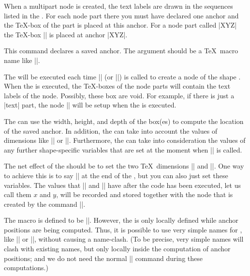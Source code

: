 \begin{command}{\pgfdeclareshape{}}
\begin{command}{\nodeparts{}}
    When a multipart node is created, the text labels are drawn in the
    sequences listed in the . For each node
    part there you must have declared one anchor and the \TeX-box of
    the part is placed at this anchor. For a node part called |XYZ|
    the \TeX-box |\pgfnodepartXYZbox| is placed at anchor |XYZ|.
  \end{command}

  \begin{command}{\savedanchor{}}
    This command declares a saved anchor. The argument 
    should be a \TeX\ macro name like |\centerpoint|.

    The  will be executed each time |\pgfnode| (or
    |\pgfmultipartnode|) is called to  create a node of the shape
    . When the 
    is executed, the \TeX-boxes of the node parts will contain the
    text labels of the node. Possibly, these box are void. For
    example, if there is just a |text| part, the node
    |\pgfnodeparttextbox| will be setup when the  is
    executed.

    The  can use the width, height, and depth of the
    box(es) to compute the location of the saved anchor. In addition,
    the  can take into account the values of dimensions like
    |\pgfshapeminwidth| or |\pgfshapeinnerxsep|. Furthermore, the
     can take into consideration the values of any further
    shape-specific variables that are set at the moment when
    |\pgfnode| is called.

    The net effect of the  should be to set the two \TeX\
    dimensions |\pgf@x| and |\pgf@y|. One way to achieve this is to
    say |\pgfpoint{|\meta{x value}|}{|\meta{y value}|}| at the end of
    the \meta{code}, but you can also just set these variables.
    The values that |\pgf@x| and |\pgf@y| have after the code has been
    executed, let us call them $x$ and $y$, will be recorded and
    stored together with the node that is created by the command
    |\pgfnode|.

    The macro  is defined to be
    ||. However, the  is only
    locally defined while anchor positions are being computed. Thus,
    it is possible to use very simple names for , like
    |\center| or |\a|, without causing a name-clash. (To be precise,
    very simple \meta{command} names will clash with existing names,
    but only locally inside the computation of anchor positions; and
    we do not need the normal |\center| command during these
    computations.)


\end{command}
\end{command}
